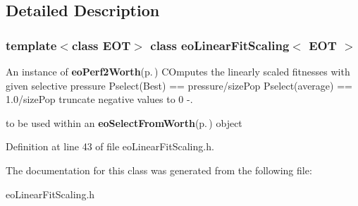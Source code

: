 \subsection{Detailed Description}
\subsubsection*{template$<$class EOT$>$ class eo\-Linear\-Fit\-Scaling$<$ EOT $>$}

An instance of {\bf eo\-Perf2Worth}{\rm (p.\,\pageref{classeo_perf2_worth})} COmputes the linearly scaled fitnesses with given selective pressure Pselect(Best) == pressure/size\-Pop Pselect(average) == 1.0/size\-Pop truncate negative values to 0 -. 

to be used within an {\bf eo\-Select\-From\-Worth}{\rm (p.\,\pageref{classeo_select_from_worth})} object 



Definition at line 43 of file eo\-Linear\-Fit\-Scaling.h.

The documentation for this class was generated from the following file:\begin{CompactItemize}
\item 
eo\-Linear\-Fit\-Scaling.h\end{CompactItemize}
